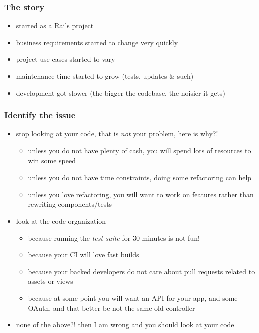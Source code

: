 \documentclass[compress]{beamer}
\begin{document}
\begin{frame}
\frametitle{The story}

\begin{itemize}[<+->]
  \item started as a Rails project
  \item business requirements started to change very quickly
  \item project use-cases started to vary
  \item maintenance time started to grow (tests, updates \& such)
  \item development got slower (the bigger the codebase, the noisier it gets)
\end{itemize}
\end{frame}

\begin{frame}
\frametitle{Identify the issue}

\begin{itemize}[<+->]
  \item stop looking at your code, that is \emph{not} your problem, here is why?!
    \begin{itemize}
      \item unless you do not have plenty of cash, you will spend lots of resources to win some speed
      \item unless you do not have time constraints, doing some refactoring can help
      \item unless you love refactoring, you will want to work on features rather than rewriting components/tests
    \end{itemize}
  \item look at the code organization
    \begin{itemize}
      \item because running the \emph{test suite} for 30 minutes is not fun!
      \item because your CI will love fast builds
      \item because your backed developers do not care about pull requests related to assets or views
      \item because at some point you will want an API for your app, and some OAuth, and that better be not the same old controller
    \end{itemize}
  \item none of the above?! then I am wrong and you should look at your code
\end{itemize}
\end{frame}
\end{document}
